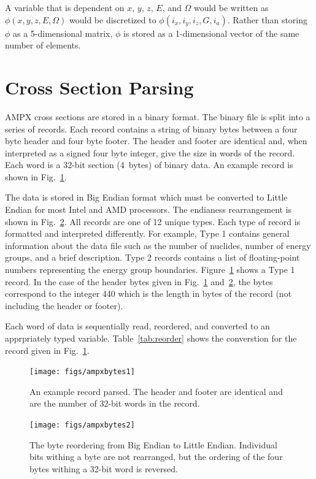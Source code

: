 A variable that is dependent on $x$, $y$, $z$, $E$, and $\Omega$ would be written as $\phi(x, y, z, E, \Omega)$ would be discretized to $\phi(i_x, i_y, i_z, G, i_a)$. Rather than storing $\phi$ as a 5-dimensional matrix, $\phi$ is stored as a 1-dimensional vector of the same number of elements.

\section{Cross Section Parsing}\label{sec:xsparse}
AMPX cross sections are stored in a binary format. The binary file is split into a series of records. Each record contains a string of binary bytes between a four byte header and four byte footer. The header and footer are identical and, when interpreted as a signed four byte integer, give the size in words of the record. Each word is a 32-bit section (4~bytes) of binary data. An example record is shown in Fig.~\ref{fig:ampxbytes1}.

The data is stored in Big Endian format which must be converted to Little Endian for most Intel and AMD processors.  The endianess rearrangement is shown in Fig.~\ref{fig:ampxbytes2}. All records are one of 12 unique types. Each type of record is formatted and interpreted differently. For example, Type 1 contains general information about the data file such as the number of nuclides, number of energy groups, and a brief description. Type 2 records contains a list of floating-point numbers representing the energy group boundaries. Figure~\ref{fig:ampxbytes1} shows a Type 1 record. In the case of the header bytes given in Fig.~\ref{fig:ampxbytes1} and~\ref{fig:ampxbytes2}, the bytes correspond to the integer 440 which is the length in bytes of the record (not including the header or footer).

Each word of data is sequentially read, reordered, and converted to an apprpriately typed variable. Table~\ref{tab:reorder} shows the converstion for the record given in Fig.~\ref{fig:ampxbytes1}.

\begin{figure}[tb]
  \begin{center}
   \texttt{[image: figs/ampxbytes1]}
  \end{center}
  \caption{An example record parsed. The header and footer are identical and are the number of 32-bit words in the record.}
\label{fig:ampxbytes1}
\end{figure}

\begin{figure}[tb]
  \begin{center}
   \texttt{[image: figs/ampxbytes2]}
  \end{center}
  \caption{The byte reordering from Big Endian to Little Endian. Individual bits withing a byte are not rearranged, but the ordering of the four bytes withing a 32-bit word is reversed.}
\label{fig:ampxbytes2}
\end{figure}

